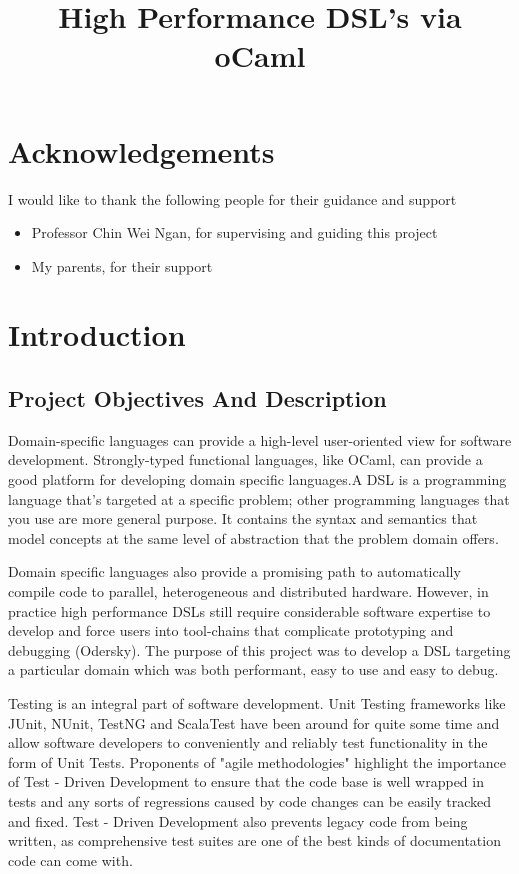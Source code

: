 \documentclass[12 pt]{article}
\title{High Performance DSL's via oCaml}
\begin{document}

\maketitle

\tableofcontents

\newpage
\section{Acknowledgements}

I would like to thank the following people for their guidance and support
\begin{itemize}
\item Professor Chin Wei Ngan, for supervising and guiding this project
\item My parents, for their support
\end{itemize}
\newpage
\section{Introduction}

\subsection{Project Objectives And Description}
Domain-specific languages can provide a high-level user-oriented view for software development. Strongly-typed functional languages, like OCaml, can provide a good platform for developing domain specific languages.A DSL is a programming language that’s targeted at a specific problem; other programming languages that you use are more general purpose. It contains the syntax and semantics that model concepts at the same level of abstraction that the problem domain offers.
\bigskip

\noindent
Domain specific languages also provide a promising path to automatically compile code to parallel, heterogeneous and distributed hardware. However, in practice high performance DSLs still require considerable software expertise to develop and force users into tool-chains that complicate  prototyping and debugging (Odersky). The purpose of this project was to develop a DSL targeting a particular domain which was both performant, easy to use and easy to debug.
\bigskip

\noindent
Testing is an integral part of software development. Unit Testing frameworks like JUnit, NUnit, TestNG and ScalaTest have been around for quite some time and allow software developers to conveniently and reliably test functionality in the form of Unit Tests. Proponents of "agile methodologies" highlight the importance of Test - Driven Development to ensure that the code base is well wrapped in tests and any sorts of regressions caused by code changes can be easily tracked and fixed. Test - Driven Development also prevents legacy code from being written, as comprehensive test suites are one of the best kinds of documentation code can come with.
\bigskip
\end{document}
